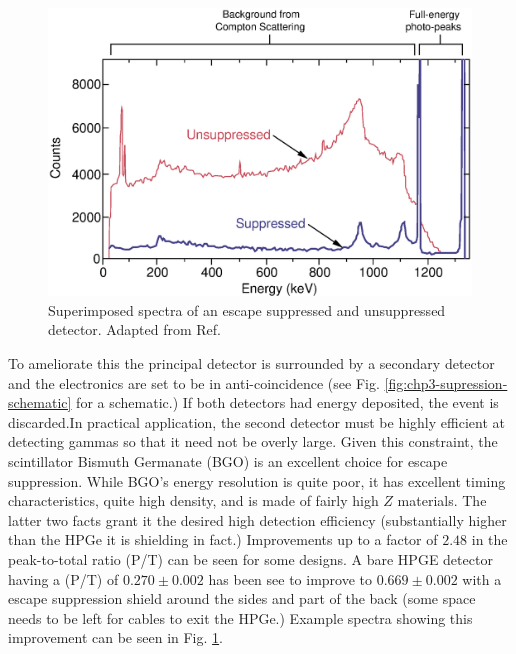 \begin{figure}[h!]
	\centerline{\includegraphics[height=0.25\textheight]{./img/c3/suppressed_spectra.eps}}
	\caption{Superimposed spectra of an escape suppressed and unsuppressed detector. Adapted from Ref.\cite{gsBooklet}}
	\label{fig:chp3-supression-improvement}
\end{figure}
To ameliorate this the principal detector is surrounded by a secondary detector and the electronics are set to be in anti-coincidence (see Fig. \ref{fig:chp3-supression-schematic} for a schematic.) If both detectors had energy deposited, the event is discarded.In practical application, the second detector must be highly efficient at detecting gammas so that it need not be overly large. Given this constraint, the scintillator Bismuth Germanate (BGO) is an excellent choice for escape suppression. While BGO's energy resolution is quite poor, it has excellent timing characteristics, quite high density, and is made of fairly high $Z$ materials. The latter two facts grant it the desired high detection efficiency (substantially higher than the HPGe it is shielding in fact.) Improvements up to a factor of $2.48$ in the peak-to-total ratio (P/T) can be seen for some designs. A bare HPGE detector having a (P/T) of $0.270\pm0.002$ has been see to improve to $0.669\pm0.002$\cite{GSComptonSuppression} with a escape suppression shield around the sides and part of the back (some space needs to be left for cables to exit the HPGe.) Example spectra showing this improvement can be seen in Fig. \ref{fig:chp3-supression-improvement}.

